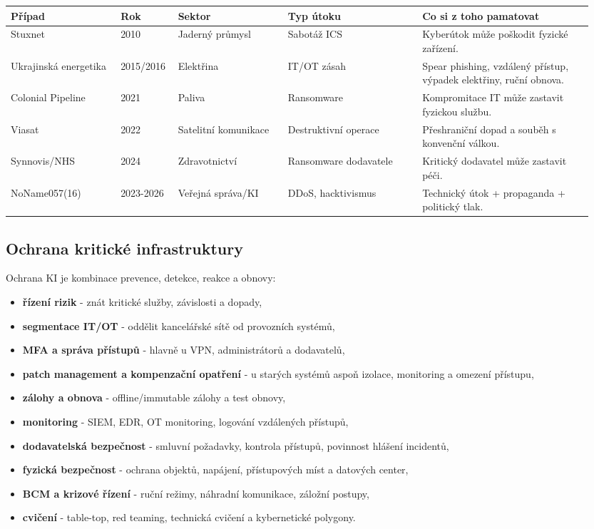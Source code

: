 \documentclass[11pt,a4paper]{article}
\begin{document}
\begin{longtable}{p{0.18\linewidth}p{0.09\linewidth}p{0.18\linewidth}p{0.22\linewidth}p{0.28\linewidth}}
\toprule
\textbf{Případ} & \textbf{Rok} & \textbf{Sektor} & \textbf{Typ útoku} & \textbf{Co si z toho pamatovat}\\
\midrule
Stuxnet & 2010 & Jaderný průmysl & Sabotáž ICS & Kyberútok může poškodit fyzické zařízení.\\
Ukrajinská energetika & 2015/2016 & Elektřina & IT/OT zásah & Spear phishing, vzdálený přístup, výpadek elektřiny, ruční obnova.\\
Colonial Pipeline & 2021 & Paliva & Ransomware & Kompromitace IT může zastavit fyzickou službu.\\
Viasat & 2022 & Satelitní komunikace & Destruktivní operace & Přeshraniční dopad a souběh s konvenční válkou.\\
Synnovis/NHS & 2024 & Zdravotnictví & Ransomware dodavatele & Kritický dodavatel může zastavit péči.\\
NoName057(16) & 2023-2026 & Veřejná správa/KI & DDoS, hacktivismus & Technický útok + propaganda + politický tlak.\\
\bottomrule
\end{longtable}

\subsection*{Ochrana kritické infrastruktury}
Ochrana KI je kombinace prevence, detekce, reakce a obnovy:
\begin{itemize}
  \item \textbf{řízení rizik} - znát kritické služby, závislosti a dopady,
  \item \textbf{segmentace IT/OT} - oddělit kancelářské sítě od provozních systémů,
  \item \textbf{MFA a správa přístupů} - hlavně u VPN, administrátorů a dodavatelů,
  \item \textbf{patch management a kompenzační opatření} - u starých systémů aspoň izolace, monitoring a omezení přístupu,
  \item \textbf{zálohy a obnova} - offline/immutable zálohy a test obnovy,
  \item \textbf{monitoring} - SIEM, EDR, OT monitoring, logování vzdálených přístupů,
  \item \textbf{dodavatelská bezpečnost} - smluvní požadavky, kontrola přístupů, povinnost hlášení incidentů,
  \item \textbf{fyzická bezpečnost} - ochrana objektů, napájení, přístupových míst a datových center,
  \item \textbf{BCM a krizové řízení} - ruční režimy, náhradní komunikace, záložní postupy,
  \item \textbf{cvičení} - table-top, red teaming, technická cvičení a kybernetické polygony.
\end{itemize}
\end{document}
